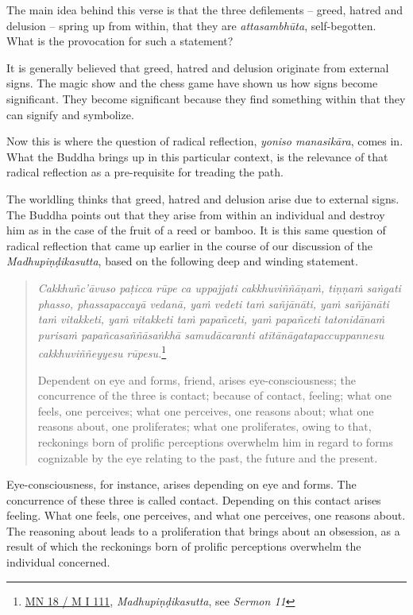 The main idea behind this verse is that the three defilements -- greed, hatred and delusion -- spring up from within, that they are \emph{attasambhūta}, self-begotten. What is the provocation for such a statement?

It is generally believed that greed, hatred and delusion originate from external signs. The magic show and the chess game have shown us how signs become significant. They become significant because they find something within that they can signify and symbolize.

Now this is where the question of radical reflection, \emph{yoniso manasikāra}, comes in. What the Buddha brings up in this particular context, is the relevance of that radical reflection as a pre-requisite for treading the path.

The worldling thinks that greed, hatred and delusion arise due to external signs. The Buddha points out that they arise from within an individual and destroy him as in the case of the fruit of a reed or bamboo. It is this same question of radical reflection that came up earlier in the course of our discussion of the \emph{Madhupiṇḍikasutta}, based on the following deep and winding statement.

\begin{quote}
\emph{Cakkhuñc'āvuso paṭicca rūpe ca uppajjati cakkhuviññāṇaṁ, tiṇṇaṁ saṅgati phasso, phassapaccayā vedanā, yaṁ vedeti taṁ sañjānāti, yaṁ sañjānāti taṁ vitakketi, yaṁ vitakketi taṁ papañceti, yaṁ papañceti tatonidānaṁ purisaṁ papañcasaññāsaṅkhā samudācaranti atītānāgatapaccuppannesu cakkhuviññeyyesu rūpesu.}\footnote{\href{https://suttacentral.net/mn18/pli/ms}{MN 18 / M I 111}, \emph{Madhupiṇḍikasutta}, see \emph{Sermon 11}}

Dependent on eye and forms, friend, arises eye-consciousness; the concurrence of the three is contact; because of contact, feeling; what one feels, one perceives; what one perceives, one reasons about; what one reasons about, one proliferates; what one proliferates, owing to that, reckonings born of prolific perceptions overwhelm him in regard to forms cognizable by the eye relating to the past, the future and the present.
\end{quote}

Eye-consciousness, for instance, arises depending on eye and forms. The concurrence of these three is called contact. Depending on this contact arises feeling. What one feels, one perceives, and what one perceives, one reasons about. The reasoning about leads to a proliferation that brings about an obsession, as a result of which the reckonings born of prolific perceptions overwhelm the individual concerned.

